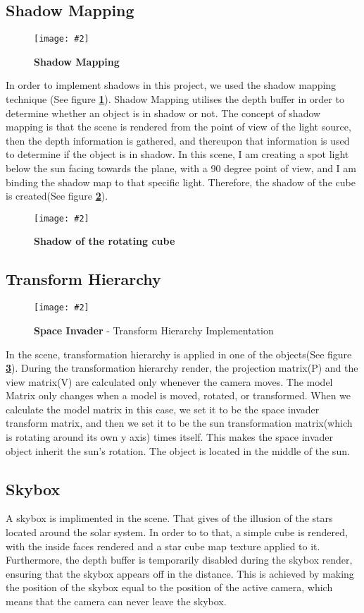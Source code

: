 \documentclass[10pt, a4paper]{article}
\newcommand{\figuremacro}[5]{
    \begin{figure}[#1]
        \centering
        \texttt{[image: \#2]}
        \caption[#3]{\textbf{#3}#4}
        \label{fig:#2}
    \end{figure}
}
\begin{document}
\subsection{Shadow Mapping}

	\figuremacro{H}{Shadow_Explanation}{Shadow Mapping}{ }{1.0}
	
	In order to implement shadows in this project, we used the shadow mapping technique (See figure \textbf{\ref{fig:Shadow_Explanation}}). Shadow Mapping utilises the depth buffer in order to determine whether an object is in shadow or not. The concept of shadow mapping is that the scene is rendered from the point of view of the light source, then the depth information is gathered, and thereupon that information is used to determine if the object is in shadow. In this scene, I am creating a spot light below the sun facing towards the plane, with a 90 degree point of view, and I am binding the shadow map to that specific light. Therefore, the shadow of the cube is created(See figure \textbf{\ref{fig:Cube_Shadow}}).
	
	
	\figuremacro{H}{Cube_Shadow}{Shadow of the rotating cube}{ }{1.0}
	

\subsection{Transform Hierarchy}

	\figuremacro{H}{Invader}{Space Invader}{ - Transform Hierarchy Implementation}{1.0}
	
	In the scene, transformation hierarchy is applied in one of the objects(See figure \textbf{\ref{fig:Invader}}). During the transformation hierarchy render, the projection matrix(P) and the view matrix(V) are calculated only whenever the camera moves. The model Matrix only changes when a model is moved, rotated, or transformed. When we calculate the model matrix in this case, we set it to be the space invader transform matrix, and then we set it to be the sun transformation matrix(which is rotating around its own y axis) times itself. This makes the space invader object inherit the sun's rotation. The object is located in the middle of the sun.
	
\subsection{Skybox}

	A skybox is implimented in the scene. That gives of the illusion of the stars located around the solar system. In order to to that, a simple cube is rendered, with the inside faces rendered and a star cube map texture applied to it. Furthermore, the depth buffer is temporarily disabled during the skybox render, ensuring that the skybox appears off in the distance. This is achieved by making the position of the skybox equal to the position of the active camera, which means that the camera can never leave the skybox.
	
\end{document}
